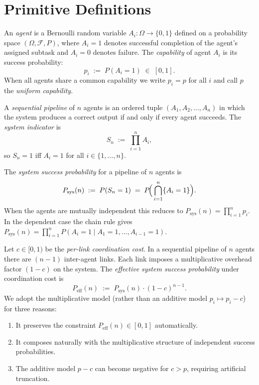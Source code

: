 \section{Primitive Definitions}
\label{sec:definitions}

\begin{definition}
\label{def:agent}
An \emph{agent} is a Bernoulli random variable $A_i : \Omega \to \{0, 1\}$ defined on a
probability space $(\Omega, \mathcal{F}, P)$, where $A_i = 1$ denotes successful completion
of the agent's assigned subtask and $A_i = 0$ denotes failure. The \emph{capability} of
agent $A_i$ is its success probability:
\[
  p_i \;:=\; P(A_i = 1) \;\in\; [0, 1].
\]
When all agents share a common capability we write $p_i = p$ for all $i$ and call $p$
the \emph{uniform capability}.
\end{definition}

\begin{definition}
\label{def:pipeline}
A \emph{sequential pipeline} of $n$ agents is an ordered tuple $(A_1, A_2, \ldots, A_n)$
in which the system produces a correct output if and only if every agent succeeds.
The \emph{system indicator} is
\[
  S_n \;:=\; \prod_{i=1}^{n} A_i,
\]
so $S_n = 1$ iff $A_i = 1$ for all $i \in \{1, \ldots, n\}$.
\end{definition}

\begin{definition}
\label{def:psys}
The \emph{system success probability} for a pipeline of $n$ agents is
\[
  P_{\mathrm{sys}}(n) \;:=\; P(S_n = 1) \;=\; P\!\Bigl(\,\bigcap_{i=1}^{n} \{A_i = 1\}\Bigr).
\]
When the agents are mutually independent this reduces to
$P_{\mathrm{sys}}(n) = \prod_{i=1}^{n} p_i$.
In the dependent case the chain rule gives
$P_{\mathrm{sys}}(n) = \prod_{i=1}^{n} P(A_i = 1 \mid A_1 = 1, \ldots, A_{i-1} = 1)$.
\end{definition}

\begin{definition}
\label{def:coord-cost}
Let $c \in [0,1)$ be the \emph{per-link coordination cost}. In a sequential pipeline of
$n$ agents there are $(n-1)$ inter-agent links. Each link imposes a multiplicative
overhead factor $(1-c)$ on the system. The \emph{effective system success probability}
under coordination cost is
\[
  P_{\mathrm{eff}}(n) \;:=\; P_{\mathrm{sys}}(n) \cdot (1-c)^{n-1}.
\]
We adopt the multiplicative model (rather than an additive model $p_i \mapsto p_i - c$)
for three reasons:
\begin{enumerate}
  \item It preserves the constraint $P_{\mathrm{eff}}(n) \in [0,1]$ automatically.
  \item It composes naturally with the multiplicative structure of independent success
        probabilities.
  \item The additive model $p - c$ can become negative for $c > p$, requiring artificial
        truncation.
\end{enumerate}
\end{definition}

